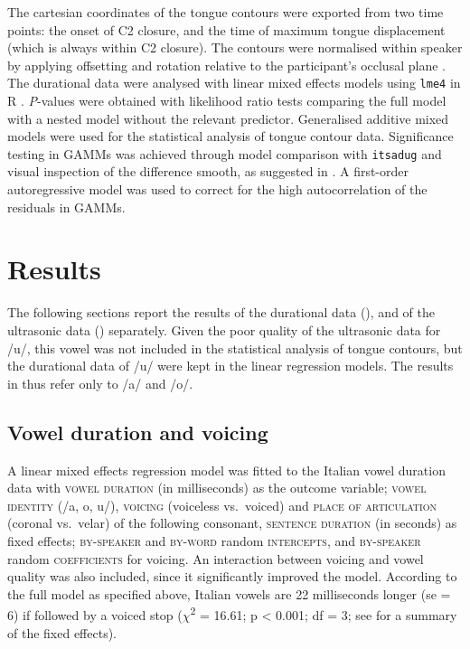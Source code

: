 \documentclass[authoryear, 5p]{elsarticle}
\begin{document}
The cartesian coordinates of the tongue contours were exported from two
time points: the onset of C2 closure, and the time of maximum tongue
displacement (which is always within C2 closure). The contours were
normalised within speaker by applying offsetting and rotation relative
to the participant's occlusal plane \citep{scobbie2011}. The durational
data were analysed with linear mixed effects models using \texttt{lme4}
in R \citep{r-core-team2017, bates2015}. \emph{P}-values were obtained
with likelihood ratio tests comparing the full model with a nested model
without the relevant predictor. Generalised additive mixed models
\citep[GAMMs,][]{wood2006, zuur2012} were used for the statistical
analysis of tongue contour data. Significance testing in GAMMs was
achieved through model comparison with \texttt{itsadug}
\citep{van-rij2017} and visual inspection of the difference smooth, as
suggested in \citet{soskuthy2017}. A first-order autoregressive model
was used to correct for the high autocorrelation of the residuals in
GAMMs.

\section{Results}\label{results}

The following sections report the results of the durational data
(), and of the ultrasonic data ()
separately. Given the poor quality of the ultrasonic data for /u/, this
vowel was not included in the statistical analysis of tongue contours,
but the durational data of /u/ were kept in the linear regression
models. The results in  thus refer only to /a/ and /o/.

\subsection{Vowel duration and
voicing}\label{vowel-duration-and-voicing}

\label{s:vow-duration}

A linear mixed effects regression model was fitted to the Italian vowel
duration data with \textsc{vowel duration} (in milliseconds) as the
outcome variable; \textsc{vowel identity} (/a, o, u/), \textsc{voicing}
(voiceless vs.~voiced) and \textsc{place of articulation} (coronal
vs.~velar) of the following consonant, \textsc{sentence duration} (in
seconds) as fixed effects; \textsc{by-speaker} and \textsc{by-word}
random \textsc{intercepts}, and \textsc{by-speaker} random
\textsc{coefficients} for voicing. An interaction between voicing and
vowel quality was also included, since it significantly improved the
model. According to the full model as specified above, Italian vowels
are 22 milliseconds longer (se = 6) if followed by a voiced stop
(\(\chi\)\textsuperscript{2} = 16.61; p \textless{} 0.001; df = 3; see
 for a summary of the fixed effects).
\end{document}

